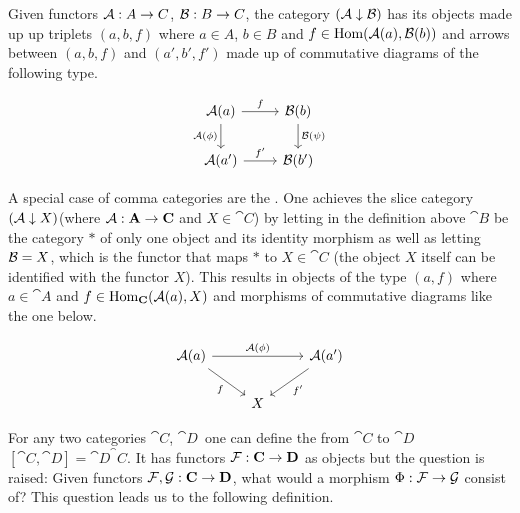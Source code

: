 \documentclass[../../main.tex]{subfiles}
\begin{document}
    \begin{definition}
        Given functors $\mathcal{A}: A \to C$, $\mathcal{B}: B \to C$, the category $(\mathcal{A} \downarrow \mathcal{B})$ has its objects made up up triplets $(a, b, f)$ where $a \in A$, $b \in B$ and $f \in \text{Hom}(\mathcal{A}(a), \mathcal{B}(b))$ and arrows between $(a, b, f)$ and $(a', b', f')$ made up of commutative diagrams of the following type.
    \end{definition}

    \begin{figure}[H]
        \[
            \begin{tikzcd}
                \functor{A}(a) \arrow[r, "f"] \arrow[d, "\functor{A}(\phi)",swap]
                & \functor{B}(b) \arrow[d, "\functor{B}(\psi)"] \\
                \functor{A}(a') \arrow[r, "f'"]
                & \functor{B}(b')
            \end{tikzcd}
        \]
    \end{figure}

    A special case of comma categories are the . One achieves the slice category $(\mathcal{A} \downarrow X)$(where $\mathcal{A}: \mathbf{A} \to \mathbf{C}$ and $X \in \cat{C}$) by letting in the definition above $\cat{B}$ be the category $*$ of only one object and its identity morphism as well as letting $\mathcal{B}=X$, which is the functor that maps $*$ to $X \in \cat{C}$ (the object $X$ itself can be identified with the functor $X$). This results in objects of the type $(a, f)$ where $a \in \cat{A}$ and $f \in \text{Hom}_\mathbf{C}(\mathcal{A}(a), X)$ and morphisms of commutative diagrams like the one below.

    \begin{figure}[H]
        \[
            \begin{tikzcd}
                \functor{A}(a) \arrow[swap]{dr}{f} \arrow{rr}{\functor{A}(\phi)} && \functor{A}(a') \arrow{dl}{f'}\\
                & X
            \end{tikzcd}
        \]
    \end{figure}

    For any two categories $\cat{C}$, $\cat{D}$ one can define the  from $\cat{C}$ to $\cat{D}$ $[\cat{C}, \cat{D}] = \cat{D}^\cat{C}$. It has functors $\mathcal{F}: \mathbf{C} \to \mathbf{D}$ as objects but the question is raised: Given functors $\mathcal{F}, \mathcal{G}: \mathbf{C} \to \mathbf{D}$, what would a morphism $\Phi: \mathcal{F} \to \mathcal{G}$ consist of? This question leads us to the following definition.
\end{document}
